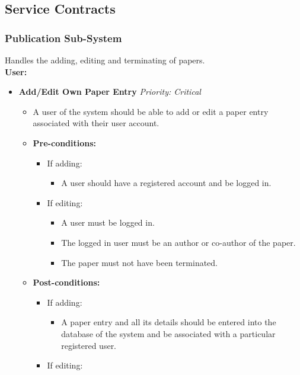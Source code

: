 \documentclass{article}
\begin{document}
		\cleardoublepage
		\subsection{Service Contracts}\label{subsec:servicecontracts}
			\subsubsection{Publication Sub-System}\label{subsubsec:publication}
				Handles the adding, editing and terminating of papers.\\
				[3mm]
				\textbf{User:}
				\begin{itemize}
					\item \textbf{Add/Edit Own Paper Entry} \hfill \textit{Priority: Critical}
					\begin{itemize}
						\item A user of the system should be able to add or edit a paper entry associated with their user account.
						\item \textbf{Pre-conditions:}
						\begin{itemize}
							\item If adding:
							\begin{itemize}
								\item A user should have a registered account and be logged in.
							\end{itemize}
							\item If editing:
							\begin{itemize}
								\item A user must be logged in.
								\item The logged in user must be an author or co-author of the paper.
								\item The paper must not have been terminated.
							\end{itemize}
						\end{itemize}
						\item \textbf{Post-conditions:}
						\begin{itemize}
							\item If adding:
							\begin{itemize}
								\item A paper entry and all its details should be entered into the database of the system and be associated with a particular registered user.
							\end{itemize}
							\item If editing:
							\begin{itemize}

\end{itemize}
\end{itemize}
\end{itemize}
\end{itemize}
\end{document}
